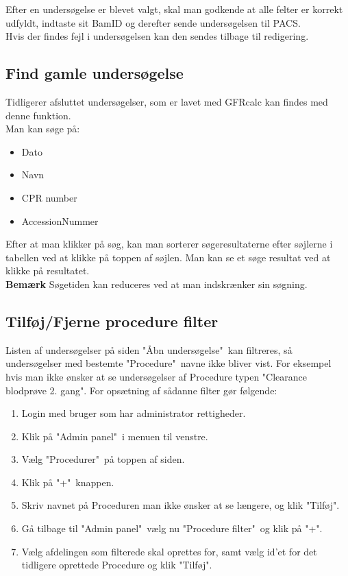 \documentclass{article}
\begin{document}
Efter en undersøgelse er blevet valgt, skal man godkende at alle felter er korrekt udfyldt, indtaste sit BamID og derefter sende undersøgelsen til PACS.\\

Hvis der findes fejl i undersøgelsen kan den sendes tilbage til redigering.

\subsection{Find gamle undersøgelse}\label{search}
Tidligerer afsluttet undersøgelser, som er lavet med GFRcalc kan findes med denne funktion.\\
Man kan søge på:
\begin{itemize}
	\item Dato
	\item Navn
	\item CPR number
	\item AccessionNummer
\end{itemize}
Efter at man klikker på søg, kan man sorterer søgeresultaterne efter søjlerne i tabellen ved at klikke på toppen af søjlen. Man kan se et søge resultat ved at klikke på resultatet.\\

\textbf{Bemærk} Søgetiden kan reduceres ved at man indskrænker sin søgning.

\subsection{Tilføj/Fjerne procedure filter}
Listen af undersøgelser på siden "Åbn undersøgelse"\ kan filtreres, så undersøgelser med bestemte "Procedure"\ navne ikke bliver vist. For eksempel hvis man ikke ønsker at se undersøgelser af Procedure typen "Clearance blodprøve 2. gang". For opsætning af sådanne filter gør følgende:
\begin{enumerate}
	\item Login med bruger som har administrator rettigheder.
	\item Klik på "Admin panel"\ i menuen til venstre.
	\item Vælg "Procedurer"\ på toppen af siden.
	\item Klik på "+"\ knappen.
	\item Skriv navnet på Proceduren man ikke ønsker at se længere, og klik "Tilføj".
	\item Gå tilbage til "Admin panel"\, vælg nu "Procedure filter"\ og klik på "+".
	\item Vælg afdelingen som filterede skal oprettes for, samt vælg id'et for det tidligere oprettede Procedure og klik "Tilføj".
\end{enumerate}
\end{document}
